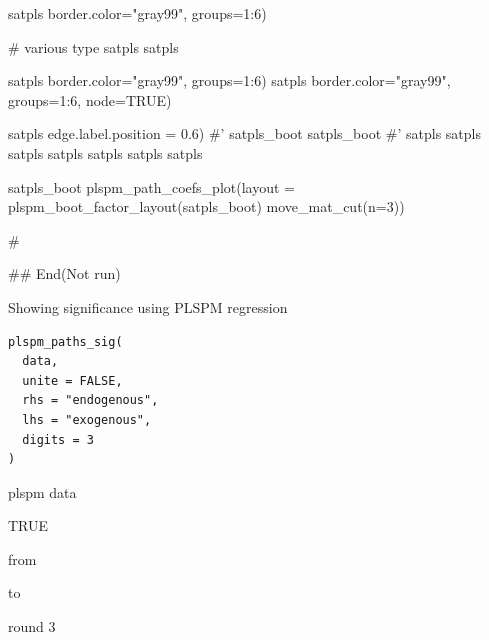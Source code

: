 \documentclass[a4paper]{book}
\begin{document}
\begin{Examples}
\begin{ExampleCode}
satpls %
                            border.color="gray99", groups=1:6)


# various type
satpls %
satpls %

satpls %
                                 border.color="gray99", groups=1:6)
satpls %
                                 border.color="gray99", groups=1:6, node=TRUE)

satpls %
                                 edge.label.position = 0.6)
#'
satpls_boot%
satpls_boot%
#'
satpls %
satpls %
satpls %
satpls %
satpls %
satpls %
satpls %

satpls_boot %
plspm_path_coefs_plot(layout =  plspm_boot_factor_layout(satpls_boot)%
 move_mat_cut(n=3))

\#



## End(Not run)
\end{ExampleCode}
\end{Examples}
%
\begin{Description}
Showing significance using PLSPM regression
\end{Description}
%
\begin{Usage}
\begin{verbatim}
plspm_paths_sig(
  data,
  unite = FALSE,
  rhs = "endogenous",
  lhs = "exogenous",
  digits = 3
)
\end{verbatim}
\end{Usage}
%
\begin{Arguments}
\begin{ldescription}
\item[\code{data}] plspm data

\item[\code{unite}] TRUE

\item[\code{rhs}] from

\item[\code{lhs}] to

\item[\code{digits}] round 3
\end{ldescription}
\end{Arguments}
\end{document}
